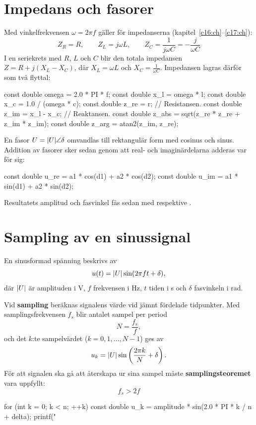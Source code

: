 \section{Impedans och fasorer}
\label{c18:sec:impedans}
Med vinkelfrekvensen $\omega = 2\pi f$ gäller för impedanserna (kapitel~\ref{c16:ch}--\ref{c17:ch}):
\[
  Z_R = R, \qquad Z_L = j\omega L, \qquad Z_C = \frac{1}{j\omega C} = -\frac{j}{\omega C}
\]
I en seriekrets med $R$, $L$ och $C$ blir den totala impedansen $Z = R + j(X_L - X_C)$, där
$X_L = \omega L$ och $X_C = \frac{1}{\omega C}$. Impedansen lagras därför som två flyttal:
\begin{ccode}
const double omega = 2.0 * PI * f;
const double x_l   = omega * l;
const double x_c   = 1.0 / (omega * c);
const double z_re  = r;         // Resistansen.
const double z_im  = x_l - x_c; // Reaktansen.
const double z_abs = sqrt(z_re * z_re + z_im * z_im);
const double z_arg = atan2(z_im, z_re);
\end{ccode}
En fasor $U = \lvert U\rvert \angle \delta$ omvandlas till rektangulär form med cosinus och sinus.
Addition av fasorer sker sedan genom att real- och imaginärdelarna adderas var för sig:
\begin{ccode}
const double u_re = a1 * cos(d1) + a2 * cos(d2);
const double u_im = a1 * sin(d1) + a2 * sin(d2);
\end{ccode}
Resultatets amplitud och fasvinkel fås sedan med  respektive .

\section{Sampling av en sinussignal}
\label{c18:sec:sampling}
En sinusformad spänning beskrivs av
\[
  u(t) = \lvert U\rvert \sin(2\pi f t + \delta),
\]
där $\lvert U\rvert$ är amplituden i V, $f$ frekvensen i Hz, $t$ tiden i s och $\delta$ fasvinkeln i
rad.

Vid \textbf{sampling} beräknas signalens värde vid jämnt fördelade tidpunkter. Med
samplingsfrekvensen $f_s$ blir antalet sampel per period
\[
  N = \frac{f_s}{f},
\]
och det $k$:te sampelvärdet ($k = 0, 1, \ldots, N-1$) ges av
\[
  u_k = \lvert U\rvert \sin\left(\frac{2\pi k}{N} + \delta\right).
\]
För att signalen ska gå att återskapa ur sina sampel måste \textbf{samplingsteoremet} vara
uppfyllt:
\[
  f_s > 2f
\]
\begin{ccode}
for (int k = 0; k < n; ++k)
{
    const double u_k = amplitude * sin(2.0 * PI * k / n + delta);
    printf("%
}
\end{ccode}

